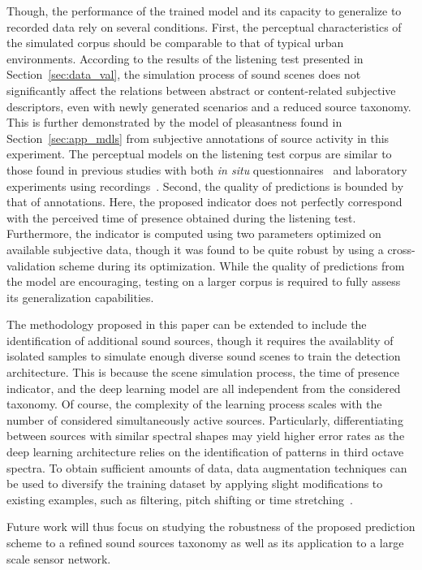 \documentclass[twocolumn]{article}
\begin{document}
Though, the performance of the trained model and its capacity to generalize to recorded data rely on several conditions. First, the perceptual characteristics of the simulated corpus should be comparable to that of typical urban environments. According to the results of the listening test presented in Section~\ref{sec:data_val}, the simulation process of sound scenes does not significantly affect the relations between abstract or content-related subjective descriptors, even with newly generated scenarios and a reduced source taxonomy. This is further demonstrated by the model of pleasantness found in Section~\ref{sec:app_mdls} from subjective annotations of source activity in this experiment. The perceptual models on the listening test corpus are similar to those found in previous studies with both \textit{in situ} questionnaires~\cite{aumond2017} and laboratory experiments using recordings~\cite{ricciardi2014}. Second, the quality of predictions is bounded by that of annotations. Here, the proposed indicator does not perfectly correspond with the perceived time of presence obtained during the listening test. Furthermore, the indicator is computed using two parameters optimized on available subjective data, though it was found to be quite robust by using a cross-validation scheme during its optimization. While the quality of predictions from the model are encouraging, testing on a larger corpus is required to fully assess its generalization capabilities.

The methodology proposed in this paper can be extended to include the identification of additional sound sources, though it requires the availablity of isolated samples to simulate enough diverse sound scenes to train the detection architecture. This is because the scene simulation process, the time of presence indicator, and the deep learning model are all independent from the considered taxonomy. Of course, the complexity of the learning process scales with the number of considered simultaneously active sources. Particularly, differentiating between sources with similar spectral shapes may yield higher error rates as the deep learning architecture relies on the identification of patterns in third octave spectra. To obtain sufficient amounts of data, data augmentation techniques can be used to diversify the training dataset by applying slight modifications to existing examples, such as filtering, pitch shifting or time stretching~\cite{salamon2017-2, lasseck2018}.

Future work will thus focus on studying the robustness of the proposed prediction scheme to a refined sound sources taxonomy as well as its application to a large scale sensor network.
\end{document}
